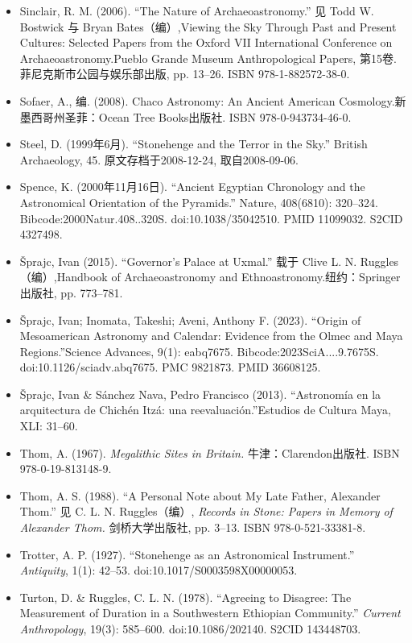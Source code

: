\begin{itemize}
    \item Sinclair, R. M. (2006). “The Nature of Archaeoastronomy.” 见 Todd W. Bostwick 与 Bryan Bates（编）,Viewing the Sky Through Past and Present Cultures: Selected Papers from the Oxford VII International Conference on Archaeoastronomy.Pueblo Grande Museum Anthropological Papers, 第15卷. 菲尼克斯市公园与娱乐部出版, pp. 13–26. ISBN 978-1-882572-38-0.
    \item Sofaer, A., 编. (2008). Chaco Astronomy: An Ancient American Cosmology.新墨西哥州圣菲：Ocean Tree Books出版社. ISBN 978-0-943734-46-0.
    \item Steel, D. (1999年6月). “Stonehenge and the Terror in the Sky.” British Archaeology, 45. 原文存档于2008-12-24, 取自2008-09-06.
    \item Spence, K. (2000年11月16日). “Ancient Egyptian Chronology and the Astronomical Orientation of the Pyramids.” Nature, 408(6810): 320–324. Bibcode:2000Natur.408..320S. doi:10.1038/35042510. PMID 11099032. S2CID 4327498.
    \item Šprajc, Ivan (2015). “Governor’s Palace at Uxmal.” 载于 Clive L. N. Ruggles（编）,Handbook of Archaeoastronomy and Ethnoastronomy.纽约：Springer出版社, pp. 773–781.
    \item Šprajc, Ivan; Inomata, Takeshi; Aveni, Anthony F. (2023). “Origin of Mesoamerican Astronomy and Calendar: Evidence from the Olmec and Maya Regions.”Science Advances, 9(1): eabq7675. Bibcode:2023SciA....9.7675S. doi:10.1126/sciadv.abq7675. PMC 9821873. PMID 36608125.
    \item Šprajc, Ivan \& Sánchez Nava, Pedro Francisco (2013). “Astronomía en la arquitectura de Chichén Itzá: una reevaluación.”Estudios de Cultura Maya, XLI: 31–60.

    \item Thom, A. (1967). \textit{Megalithic Sites in Britain.} 牛津：Clarendon出版社. ISBN 978-0-19-813148-9.

    \item Thom, A. S. (1988). “A Personal Note about My Late Father, Alexander Thom.” 见 C. L. N. Ruggles（编）, \textit{Records in Stone: Papers in Memory of Alexander Thom.} 剑桥大学出版社, pp. 3–13. ISBN 978-0-521-33381-8.

    \item Trotter, A. P. (1927). “Stonehenge as an Astronomical Instrument.” \textit{Antiquity}, 1(1): 42–53. doi:10.1017/S0003598X00000053.

    \item Turton, D. \& Ruggles, C. L. N. (1978). “Agreeing to Disagree: The Measurement of Duration in a Southwestern Ethiopian Community.” \textit{Current Anthropology}, 19(3): 585–600. doi:10.1086/202140. S2CID 143448703.


\end{itemize}
